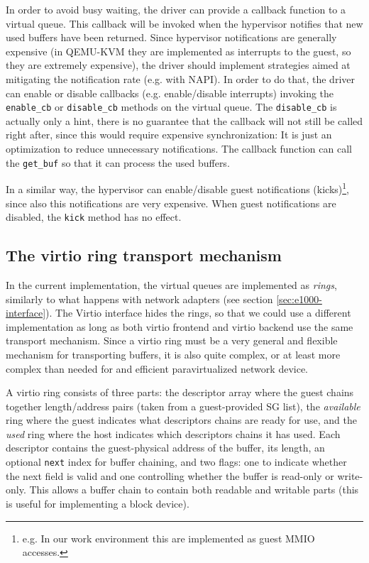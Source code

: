 In order to avoid busy waiting, the driver can provide a callback function to a virtual queue. This callback will be invoked when the
hypervisor notifies that new used buffers have been returned. Since hypervisor notifications are generally expensive (in QEMU-KVM they are 
implemented as interrupts to the guest, so they are extremely expensive), the driver should implement strategies aimed at mitigating the
notification rate (e.g. with NAPI). In order to do that, the driver can enable or disable callbacks (e.g. enable/disable interrupts) 
invoking the \texttt{enable\_cb} or \texttt{disable\_cb} methods on the virtual queue. The \texttt{disable\_cb} is actually only a hint,
there is no guarantee that the callback will not still be called right after, since this would require expensive synchronization: It is
just an optimization to reduce unnecessary notifications.
The callback function can call the \texttt{get\_buf} so that it can process the used buffers.

\vspace{0.5cm}

In a similar way, the hypervisor can enable/disable guest notifications (kicks)\footnote{e.g. In our work environment this are
implemented as guest MMIO accesses.}, since also this notifications are very expensive. When guest notifications are disabled,
the \texttt{kick} method has no effect.


\subsection{The virtio ring transport mechanism}
In the current implementation, the virtual queues are implemented as \emph{rings}, similarly to what happens with network adapters (see
section \ref{sec:e1000-interface}). The Virtio interface hides the rings, so that we could use a different implementation as
long as both virtio frontend and virtio backend use the same transport mechanism.
Since a virtio ring must be a very general and flexible mechanism for transporting buffers, it is also quite complex, or at least more
complex than needed for and efficient paravirtualized network device.

\vspace{0.5cm}

A virtio ring consists of three parts: the descriptor array where the guest chains together length/address pairs (taken from a guest-provided
SG list), the \emph{available} ring where the guest indicates what descriptors chains are ready for use, and the \emph{used} ring where the
host indicates which descriptors chains it has used. Each descriptor contains the guest-physical address of the buffer, its length, an 
optional \texttt{next} index for buffer chaining, and two flags: one to indicate whether the next field is valid and one controlling 
whether the buffer is read-only or write-only. This allows a buffer chain to contain both readable and writable parts (this is 
useful for implementing a block device).

